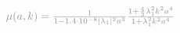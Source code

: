 \documentclass[preview]{standalone}
\begin{document}
$ \textcolor{Gray}{\mu(a,k) = \frac{1}{1-1.4 \cdot 10^{-8}|\lambda_1|^2 a^3} \frac{1+\frac{4}{3}\lambda_1^2 k^2 a^4}{1+ \lambda_1^2 k^2 a^4} } $
\end{document}
